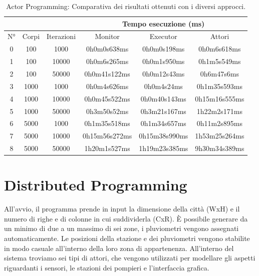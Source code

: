 \documentclass[12pt,a4paper,openright,twoside]{book}
\begin{document}
\begin{table}[h!]
	\centering
	\begin{tabular}{ |c|c|c|c|c|c| } 
	\hline
    &&& \multicolumn{3}{|c|}{Tempo esecuzione (ms)} \\
    \hline
	N° & Corpi & Iterazioni & Monitor & Executor & Attori \\
	\hline
	0 & 100 & 1000 & 0h0m0s638ms & 0h0m0s198ms & 0h0m6s618ms \\ 
    \hline
    1 & 100 & 10000 & 0h0m6s265ms & 0h0m1s950ms & 0h1m5s549ms \\ 
     \hline
    2 & 100 & 50000 & 0h0m41s122ms & 0h0m12s43ms & 0h6m47s6ms \\ 
     \hline
    3 & 1000 & 1000 & 0h0m4s626ms & 0h0m4s24ms & 0h1m35s593ms \\ 
     \hline
    4 & 1000 & 10000 & 0h0m45s522ms & 0h0m40s143ms & 0h15m16s555ms \\ 
     \hline
    5 & 1000 & 50000 & 0h3m50s52ms & 0h3m21s167ms & 1h22m2s171ms \\ 
     \hline
    6 & 5000 & 1000 & 0h1m35s518ms & 0h1m34s657ms & 0h11m2s895ms \\ 
     \hline
    7 & 5000 & 10000 & 0h15m56s272ms & 0h15m38s990ms & 1h53m25s264ms \\ 
     \hline
    8 & 5000 & 50000 & 1h20m1s527ms & 1h19m23s385ms & 9h30m34s389ms \\ 
     \hline
	\end{tabular}
	\caption{Actor Programming: Comparativa dei risultati ottenuti con i diversi approcci.}
	\label{tab:table1}
\end{table}

\section{Distributed Programming}
All'avvio, il programma prende in input la dimensione della città (WxH) e il numero di righe e di colonne in cui suddividerla (CxR). È possibile generare da un minimo di due a un massimo di sei zone, i pluviometri vengono assegnati automaticamente. Le posizioni della stazione e dei pluviometri vengono stabilite in modo casuale all'interno della loro zona di appartenenza.
All'interno del sistema troviamo sei tipi di attori, che vengono utilizzati per modellare gli aspetti riguardanti i sensori, le stazioni dei pompieri e l'interfaccia grafica.
\end{document}
